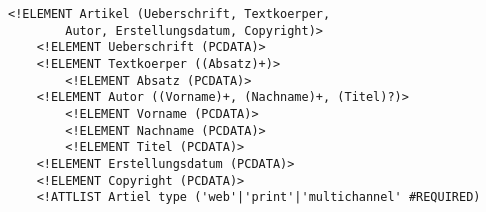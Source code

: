 \lstset{language=XML}
\begin{lstlisting}
<!ELEMENT Artikel (Ueberschrift, Textkoerper,
        Autor, Erstellungsdatum, Copyright)>
    <!ELEMENT Ueberschrift (PCDATA)>
    <!ELEMENT Textkoerper ((Absatz)+)>
        <!ELEMENT Absatz (PCDATA)>
    <!ELEMENT Autor ((Vorname)+, (Nachname)+, (Titel)?)>
        <!ELEMENT Vorname (PCDATA)>
        <!ELEMENT Nachname (PCDATA)>
        <!ELEMENT Titel (PCDATA)>
    <!ELEMENT Erstellungsdatum (PCDATA)>
    <!ELEMENT Copyright (PCDATA)>
    <!ATTLIST Artiel type ('web'|'print'|'multichannel' #REQUIRED)
\end{lstlisting}






































































